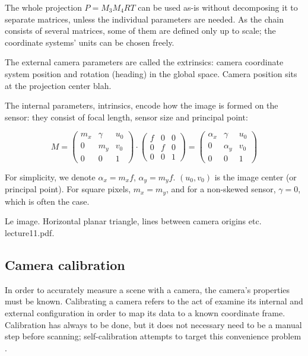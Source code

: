 The whole projection $P = M_3 M_4 R T$ can be used as-is without decomposing it to separate matrices, unless the individual parameters are needed. As the chain consists of several matrices, some of them are defined only up to scale; the coordinate systems' units can be chosen freely.

The external camera parameters are called the extrinsics: camera coordinate system position and rotation (heading) in the global space.
Camera position sits at the projection center blah.

The internal parameters, intrinsics, encode how the image is formed on the sensor: they consist of focal length, sensor size and principal point:

\begin{equation}
	M =
	\begin{pmatrix}
		m_x & \gamma & u_0\\
		0   &    m_y & v_0\\
		0   &        0 & 1
	\end{pmatrix}
\cdot
	\begin{pmatrix}
		f & 0 & 0\\
		0 & f & 0\\
		0 & 0 & 1
	\end{pmatrix}
	=
	\begin{pmatrix}
		\alpha_x & \gamma   & u_0\\
		0        & \alpha_y & v_0\\
		0        & 0        & 1
	\end{pmatrix}
\end{equation}

For simplicity, we denote $\alpha_x = m_x f$, $\alpha_y = m_y f$. $(u_0, v_0)$ is the image center (or principal point). For square pixels, $m_x = m_y$, and for a non-skewed sensor, $\gamma = 0$, which is often the case.

Le image. Horizontal planar triangle, lines between camera origins etc. lecture11.pdf.

\subsection{Camera calibration}


In order to accurately measure a scene with a camera, the camera's properties must be known. Calibrating a camera refers to the act of examine its internal and external configuration in order to map its data to a known coordinate frame.
Calibration has always to be done, but it does not necessary need to be a manual step before scanning; self-calibration attempts to target this convenience problem \cite{pollefeys1999hand, ETC}.

